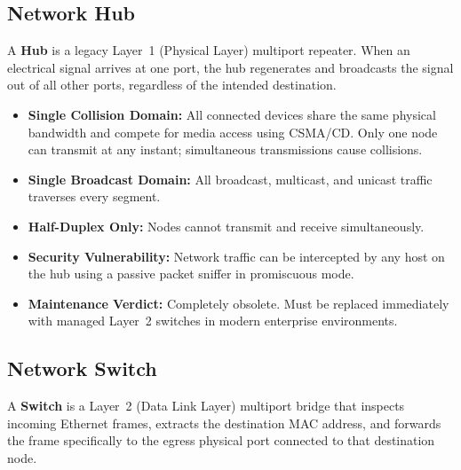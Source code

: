 \subsection{Network Hub}
A \textbf{Hub} is a legacy Layer~1 (Physical Layer) multiport repeater. When an electrical signal arrives at one port, the hub regenerates and broadcasts the signal out of all other ports, regardless of the intended destination.
\begin{itemize}[leftmargin=*]
    \item \textbf{Single Collision Domain:} All connected devices share the same physical bandwidth and compete for media access using CSMA/CD. Only one node can transmit at any instant; simultaneous transmissions cause collisions.
    \item \textbf{Single Broadcast Domain:} All broadcast, multicast, and unicast traffic traverses every segment.
    \item \textbf{Half-Duplex Only:} Nodes cannot transmit and receive simultaneously.
    \item \textbf{Security Vulnerability:} Network traffic can be intercepted by any host on the hub using a passive packet sniffer in promiscuous mode.
    \item \textbf{Maintenance Verdict:} Completely obsolete. Must be replaced immediately with managed Layer~2 switches in modern enterprise environments.
\end{itemize}

\subsection{Network Switch}
A \textbf{Switch} is a Layer~2 (Data Link Layer) multiport bridge that inspects incoming Ethernet frames, extracts the destination MAC address, and forwards the frame specifically to the egress physical port connected to that destination node.

